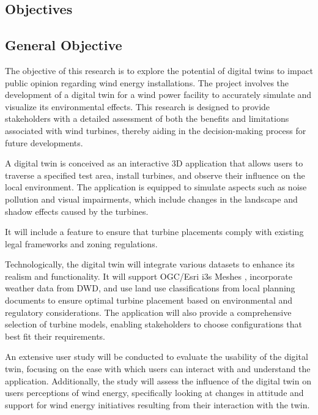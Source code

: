 \documentclass[11pt, titlepage, a4paper]{article}
\begin{document}
\begin{linenumbers}
    \section{Objectives}
    \subsection{General Objective}
    The objective of this research is to explore the potential of digital twins to impact public opinion regarding wind energy installations. The project involves the development of a digital twin for a wind power facility to accurately simulate and visualize its environmental effects. This research is designed to provide stakeholders with a detailed assessment of both the benefits and limitations associated with wind turbines, thereby aiding in the decision-making process for future developments.

    A digital twin is conceived as an interactive 3D application that allows users to traverse a specified test area, install turbines, and observe their influence on the local environment. The application is equipped to simulate aspects such as noise pollution and visual impairments, which include changes in the landscape and shadow effects caused by the turbines.

    It will include a feature to ensure that turbine placements comply with existing legal frameworks and zoning regulations.

    Technologically, the digital twin will integrate various datasets to enhance its realism and functionality. It will support OGC/Esri i3s Meshes \cite{esriincI3sspec}, incorporate weather data from DWD, and use land use classifications from local planning documents %
    to ensure optimal turbine placement based on environmental and regulatory considerations. The application will also provide a comprehensive selection of turbine models, enabling stakeholders to choose configurations that best fit their requirements.

    An extensive user study will be conducted to evaluate the usability of the digital twin, focusing on the ease with which users can interact with and understand the application. Additionally, the study will assess the influence of the digital twin on users perceptions of wind energy, specifically looking at changes in attitude and support for wind energy initiatives resulting from their interaction with the twin.






\end{linenumbers}
\end{document}
